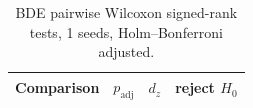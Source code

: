 \begin{table}[t]
\centering
\small
\caption{BDE pairwise Wilcoxon signed-rank tests, 1 seeds, Holm--Bonferroni adjusted.}
\label{tab:bde_pw}
\begin{tabular}{lrrc}
\toprule
Comparison & $p_{\mathrm{adj}}$ & $d_z$ & reject $H_0$ \\
\midrule
\bottomrule
\end{tabular}
\end{table}
